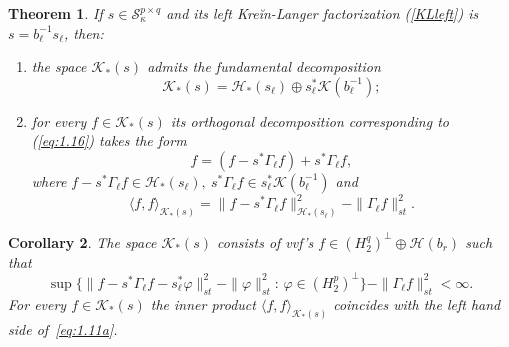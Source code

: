 \documentclass[12pt,twoside,a4paper]{amsart}
\newtheorem{thm}{Theorem}[section]
\newtheorem{corollary}[thm]{Corollary}
\theoremstyle{definition}
\numberwithin{equation}{section}
\begin{document}
\begin{thm}\label{thm:1.12}
If $s\in {\mathcal S}^{p\times q}_\kappa$ and its left Kre\u{i}n-Langer
factorization (\ref{KLleft}) is $s=b_\ell^{-1}s_\ell$, then:
\begin{enumerate}
    \item [\rm(1)] the space ${{\mathcal K}}_*(s)$ admits the fundamental
    decomposition
    \begin{equation}\label{eq:1.16}
    {{\mathcal K}}_*(s)={{\mathcal H}}_*(s_\ell)\oplus s_\ell^*  {{\mathcal K}}(b^{-1}_\ell);
    \end{equation}
    \item [\rm(2)]for every $f\in {{\mathcal K}}_*(s)$ its orthogonal
    decomposition corresponding to (\ref{eq:1.16}) takes the form
    \begin{equation}\label{eq:1.17}
   f=(f-s^*\Gamma_\ell f)+s^*\Gamma_\ell f,
\end{equation}
where $f-s^*\Gamma_\ell f\in{{\mathcal H}}_*(s_\ell),\ s^*\Gamma_\ell f\in
s_\ell^*{{\mathcal K}}(b^{-1}_\ell)$ and
\begin{equation}\label{eq:1.18}
   \langle
   f,f\rangle_{{{\mathcal K}}_*(s)}=\|f-s^*\Gamma_\ell f\|^2_{{{\mathcal H}}_*(s_\ell)}-\|\Gamma_\ell f\|^2_{st}.
   \end{equation}
\end{enumerate}
\end{thm}

\begin{corollary}
The space ${{\mathcal K}}_*(s)$ consists of vvf's $f\in
(H^q_2)^\perp\oplus{{\mathcal H}}(b_r)$ such that
\begin{equation}\label{eq:1.11a}
\sup\{\|f-s^*\Gamma_\ell
f-s^*_\ell\varphi\|^2_{st}-\|\varphi\|^2_{st}:\,\varphi\in
   (H^p_2)^\perp\}-\|\Gamma_\ell f\|^2_{st}<\infty.
\end{equation}
For every $f\in{{\mathcal K}}_*(s)$ the inner product $\langle
f,f\rangle_{{{\mathcal K}}_*(s)}$ coincides with the left hand side
of~\eqref{eq:1.11a}.
\end{corollary}
\end{document}
